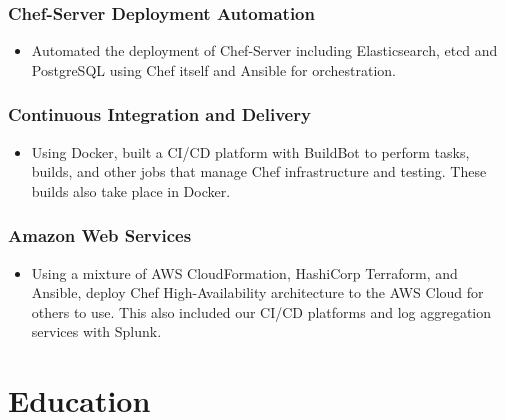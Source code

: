 \documentclass{article}
\begin{document}
      \begin{scriptsize}

      \subsubsection{Chef-Server Deployment Automation}

        \begin{itemize}

          \item Automated the deployment of Chef-Server including
            Elasticsearch, etcd and PostgreSQL using Chef itself and Ansible
            for orchestration.

        \end{itemize}

      \subsubsection{Continuous Integration and Delivery}

        \begin{itemize}

          \item Using Docker, built a CI/CD platform with BuildBot to perform
            tasks, builds, and other jobs that manage Chef infrastructure and
            testing. These builds also take place in Docker.

        \end{itemize}

      \subsubsection{Amazon Web Services}

        \begin{itemize}

          \item Using a mixture of AWS CloudFormation, HashiCorp Terraform, and
            Ansible, deploy Chef High-Availability architecture to the AWS
            Cloud for others to use. This also included our CI/CD platforms and
            log aggregation services with Splunk.

        \end{itemize}

      \end{scriptsize}

  \section{Education}
\end{document}
